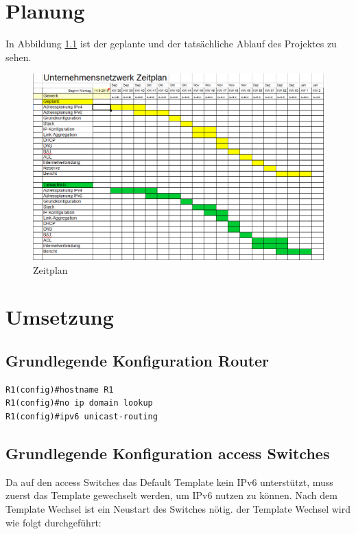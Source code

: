 \documentclass[11pt,a4paper]{scrreprt}
\begin{document}
\newpage
\chapter{Planung}
In Abbildung \ref{abb:Zeitplan} ist der geplante und der tatsächliche Ablauf des Projektes zu sehen. 
\begin{figure}[H]
\begin{center}
\includegraphics[angle=90,scale=0.7]{Zeitplan.png}
\caption{Zeitplan}
\label{abb:Zeitplan}
\end{center}
\end{figure}

\chapter{Umsetzung}


\section{Grundlegende Konfiguration Router}

 \begin{lstlisting}[frame=single, captionpos=b,caption= Router Grund Konfig]
R1(config)#hostname R1
R1(config)#no ip domain lookup
R1(config)#ipv6 unicast-routing
\end{lstlisting}

\section{Grundlegende Konfiguration access Switches}
Da auf den access Switches das Default Template kein IPv6 unterstützt, muss zuerst das Template gewechselt werden, um IPv6 nutzen zu können. Nach dem Template Wechsel ist ein Neustart des Switches nötig. der Template Wechsel wird wie folgt durchgeführt:
\newline
\end{document}
